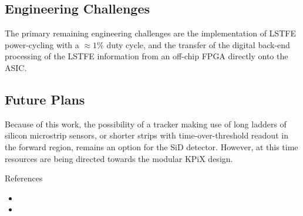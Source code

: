 \subsection{Engineering Challenges}

The primary remaining engineering challenges are the implementation of LSTFE power-cycling with a $\approx 1\%$
duty cycle, and the transfer of the digital back-end processing of the LSTFE information from
an off-chip FPGA directly onto the ASIC.

\subsection{Future Plans}

Because of this work, the possibility of a tracker making use of long ladders of silicon
microstrip sensors, or shorter strips with time-over-threshold readout in the forward
region, remains an option for the SiD detector. However, at this time resources are
being directed towards the modular KPiX design.



References
\begin{itemize}
\item {}
\item {}
\end{itemize}
